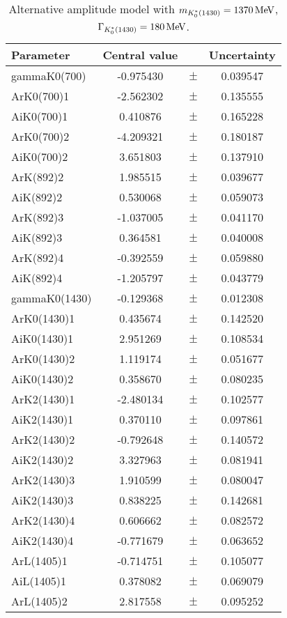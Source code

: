 \begin{table}
\centering
\caption{Alternative amplitude model with $m_{K^*_0(1430)} = 1370 \text{\,Me\kern -0.1em V}$, $\Gamma_{K^*_0(1430)} = 180 \text{\,Me\kern -0.1em V}$.}
\begin{tiny}
\begin{tabular}{lccc}
\toprule
Parameter & Central value & & Uncertainty\\
\midrule
gammaK0(700) & -0.975430 & $\pm$ & 0.039547 \\
ArK0(700)1 & -2.562302 & $\pm$ & 0.135555 \\
AiK0(700)1 & 0.410876 & $\pm$ & 0.165228 \\
ArK0(700)2 & -4.209321 & $\pm$ & 0.180187 \\
AiK0(700)2 & 3.651803 & $\pm$ & 0.137910 \\
ArK(892)2 & 1.985515 & $\pm$ & 0.039677 \\
AiK(892)2 & 0.530068 & $\pm$ & 0.059073 \\
ArK(892)3 & -1.037005 & $\pm$ & 0.041170 \\
AiK(892)3 & 0.364581 & $\pm$ & 0.040008 \\
ArK(892)4 & -0.392559 & $\pm$ & 0.059880 \\
AiK(892)4 & -1.205797 & $\pm$ & 0.043779 \\
gammaK0(1430) & -0.129368 & $\pm$ & 0.012308 \\
ArK0(1430)1 & 0.435674 & $\pm$ & 0.142520 \\
AiK0(1430)1 & 2.951269 & $\pm$ & 0.108534 \\
ArK0(1430)2 & 1.119174 & $\pm$ & 0.051677 \\
AiK0(1430)2 & 0.358670 & $\pm$ & 0.080235 \\
ArK2(1430)1 & -2.480134 & $\pm$ & 0.102577 \\
AiK2(1430)1 & 0.370110 & $\pm$ & 0.097861 \\
ArK2(1430)2 & -0.792648 & $\pm$ & 0.140572 \\
AiK2(1430)2 & 3.327963 & $\pm$ & 0.081941 \\
ArK2(1430)3 & 1.910599 & $\pm$ & 0.080047 \\
AiK2(1430)3 & 0.838225 & $\pm$ & 0.142681 \\
ArK2(1430)4 & 0.606662 & $\pm$ & 0.082572 \\
AiK2(1430)4 & -0.771679 & $\pm$ & 0.063652 \\
ArL(1405)1 & -0.714751 & $\pm$ & 0.105077 \\
AiL(1405)1 & 0.378082 & $\pm$ & 0.069079 \\
ArL(1405)2 & 2.817558 & $\pm$ & 0.095252 \\

\end{tabular}
\end{tiny}
\end{table}
